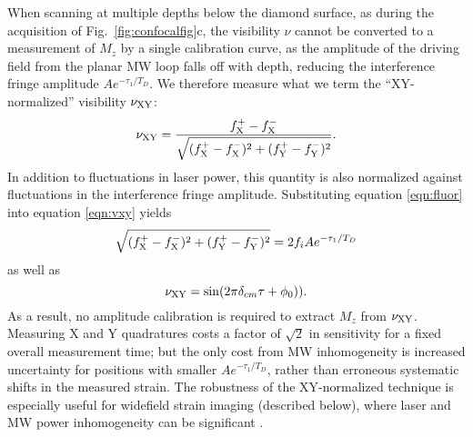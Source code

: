 \documentclass[reprint,superscriptaddress,hyphens,amsmath,amssymb,aps,prx,float]{revtex4-2}
\begin{document}
\imageronefig

When scanning at multiple depths below the diamond surface, as during the acquisition of Fig.~\ref{fig:confocalfig}c, the visibility $\nu$ cannot be converted to a measurement of $M_z$ by a single calibration curve, as the amplitude of the driving field from the planar MW loop falls off with depth, reducing the interference fringe amplitude $A e^{-\tau_1/T_D}$. We therefore measure what we term the ``XY-normalized'' visibility $\nu_{\rm{XY}}$:
\begin{equation}
\label{eqn:vxy}
    \nu_{\rm XY}=\frac{f_{\rm X}^+-f_{\rm X}^-}{\sqrt{(f_{\rm X}^+-f_{\rm X}^-)^2+(f_{\rm Y}^+-f_{\rm Y}^-)^2}}.
\end{equation}  
In addition to fluctuations in laser power, this quantity is also normalized against fluctuations in the interference fringe amplitude. 
Substituting equation \eqref{eqn:fluor} into equation \eqref{eqn:vxy} yields 
\begin{equation}
    \sqrt{(f_{\rm X}^+-f_{\rm X}^-)^2+(f_{\rm Y}^+-f_{\rm Y}^-)^2}=2f_{i}A e^{-\tau_1/T_D}
\end{equation}
as well as
\begin{equation}
\nu_{\rm XY}=\sin(2\pi \delta_{cm} \tau+\phi_0)).
\end{equation}
As a result, no amplitude calibration is required to extract $M_z$ from $\nu_{\rm{XY}}$.  Measuring X and Y quadratures costs a factor of $\sqrt{2}$ in sensitivity for a fixed overall measurement time; but the only cost from MW inhomogeneity is increased uncertainty for positions with smaller $A e^{-\tau_1/T_D}$, rather than erroneous systematic shifts in the measured strain.  The robustness of the XY-normalized technique is especially useful for widefield strain imaging (described below), where laser and MW power inhomogeneity can be significant \cite{KuDiracFlow2020}.
\end{document}
